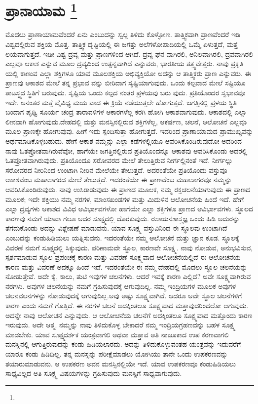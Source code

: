 
\chapter[ಪ್ರಾನಾಯಾಮ ]{ಪ್ರಾನಾಯಾಮ \protect\footnote{}}

ಮೊದಲು ಪ್ರಾಣಾಯಾಮವೆಂದರೆ ಏನು ಎಂಬುದನ್ನು ಸ್ವಲ್ಪ ತಿಳಿದು ಕೊಳ್ಳೋಣ. ತಾತ್ತ್ವಿಕವಾಗಿ ಪ್ರಾಣವೆಂದರೆ ಇಡಿ ವಿಶ್ವದಲ್ಲಿರುವ ಶಕ್ತಿಯ ಮೊತ್ತ. ತಾತ್ತ್ವಿಕ ದೃಷ್ಟಿಯಲ್ಲಿ ಈ ಜಗತ್ತು ಅಲೆಗಳೋಪಾದಿಯಲ್ಲಿ ಒಮ್ಮೆ ಏಳುತ್ತದೆ, ಮತ್ತೆ ಲಯವಾಗುತ್ತದೆ. ಇಡೀ ವಿಶ್ವ ದ್ರವ್ಯ ಮತ್ತು ಪ್ರಾಣಗಳಿಂದ ಆಗಿದೆ. ದ್ರವ್ಯ ಘನ ವಾಗಿರಲಿ, ಅನಿಲವಾಗಿರಲಿ, ದ್ರವವಾಗಿರಲಿ ಎಲ್ಲವೂ ಆಕಾಶ ಎನ್ನುವ ಮೂಲ ದ್ರವ್ಯದಿಂದ ಉತ್ಪನ್ನವಾಗಿದೆ ಎನ್ನುವರು, ಭಾರತೀಯ ತತ್ತ್ವವೇತ್ತರು. ನಾವು ಪ್ರಕೃತಿ ಯಲ್ಲಿ ಕಾಣುವ ಎಲ್ಲಾ ಶಕ್ತಿಗಳೂ ಯಾವ ಮೂಲಶಕ್ತಿಯ ಅಭಿವ್ಯಕ್ತಿಯೋ ಅದನ್ನು ಆ ತಾತ್ತ್ವಿಕರು ಪ್ರಾಣ ಎನ್ನುವರು. ಈ ಪ್ರಾಣವು ಆಕಾಶದ ಮೇಲೆ ತನ್ನ ಪ್ರಭಾವ ವನ್ನು ಬೀರಿದಾಗ ಸೃಷ್ಟಿಯಾಗುವುದು. ಒಂದು ಕಲ್ಪವಾದ ಮೇಲೆ ಸಷ್ಟಿಯೂ ತಾಟಸ್ಥ್ಯದ ಸ್ಥಿತಿಗೆ ಬರುವುದು. ಸೃಷ್ಟಿಯ ಒಂದು ಕಲ್ಪದ ನಂತರ ಪ್ರಳಯವು ಬರು ವುದು. ಪ್ರತಿಯೊಂದರ ಸ್ವಭಾವವೂ ಇದೇ. ಅನಂತರ ಮತ್ತೆ ವೈವಿಧ್ಯ ಮಯ ವಾದ ಈ ಕ್ರಿಯೆ ನಡೆಯುತ್ತಲೇ ಹೋಗುತ್ತದೆ. ಜಗತ್ತಿನಲ್ಲಿ ಪ್ರಳಯ ಸ್ಥಿತಿ ಬಂದಾಗ ಪೃಥ್ವಿ ಸೂರ್ಯ ಚಂದ್ರ ತಾರಾವಳಿಗಳ ಆಕಾರಗಳೆಲ್ಲ ಕರಗಿ ಹೋಗಿ ಆಕಾಶವಾಗುವುದು. ಆಕಾಶದಲ್ಲಿ ಎಲ್ಲಾ ಲೀನವಾಗಿ ಹೋಗುವುದು.ದೇಹದಲ್ಲಿ ಮತ್ತು ಮನಸ್ಸಿನಲ್ಲಿರುವ ಶಕ್ತಿಗಳೆಲ್ಲ, ಆಕರ್ಷಣ, ಚಲನೆ, ಆಲೋಚನೆ ಎಲ್ಲವೂ ಮೂಲ ಪ್ರಾಣಕ್ಕೇ ಹೋಗುವುವು. ಹೀಗೆ ಇದು ಸ್ಪಂದಿಸುತ್ತಾ ಹೋಗುತ್ತದೆ. ಇದರಿಂದ ಪ್ರಾಣಾಯಾಮದ ಪ್ರಾಮುಖ್ಯವನ್ನು ಅರ್ಥಮಾಡಿಕೊಳ್ಳಬಹುದು. ಹೇಗೆ ಆಕಾಶ ನಮ್ಮನ್ನು ಎಲ್ಲಾ ಕಡೆಗಳಲ್ಲಿಯೂ ಆವರಿಸಿಕೊಂಡಿರುವುದೋ ಅದರಿಂದ ನಾವು ಓತಪ್ರೋತವಾಗಿರುವೆವೋ, ಹಾಗೆಯೇ ಜಗತ್ತಿನಲ್ಲಿರುವ ಪ್ರತಿಯೊಂದನ್ನೂ ಆಕಾಶವು ಆವರಿಸಿಕೊಂಡು ಅದರಲ್ಲಿ ಓತಪ್ರೋತವಾಗಿರುವುದು. ಪ್ರತಿಯೊಂದೂ ಸರೋವರದ ಮೇಲೆ ತೇಲುತ್ತಿರುವ ನೀರ್ಗಲ್ಲಿನಂತೆ ಇದೆ. ನೀರ್ಗಲ್ಲು ಸರೋವರದ ನೀರಿನಿಂದ ಉಂಟಾಗಿ ನೀರಿನ ಮೇಲೆಯೇ ತೇಲುತ್ತದೆ. ಅದರಂತೆಯೇ ಪ್ರತಿಯೊಂದು ವಸ್ತುವೂ ಆಕಾಶವೆಂಬ ಮಹಾಸಾಗರದ ಮೇಲೆ ತೇಲುತ್ತದೆ. ಇದರಂತೆಯೇ ಈ ಪ್ರಾಣವೆಂಬ ಮಹಾಸಾಗರವೂ ನಮ್ಮನ್ನು ಆವರಿಸಿಕೊಂಡಿರುವುದು. ನಾವು ಉಸಿರಾಡುವುದು ಈ ಪ್ರಾಣದ ಮೂಲಕ, ನಮ್ಮ ರಕ್ತಚಲನೆಯಾಗುವುದು ಈ ಪ್ರಾಣದ ಮೂಲಕ; ಇದೇ ಶಕ್ತಿಯು ನಮ್ಮ ನರಗಳ, ಮಾಂಸಖಂಡಗಳ ಮತ್ತು ಮಿದುಳಿನ ಆಲೋಚನೆಯ ಹಿಂದೆ ಇದೆ. ಹೇಗೆ ಎಲ್ಲಾ ದ್ರವ್ಯಗಳು ಆಕಾಶದ ವಿವಿಧ ಆವಿರ್ಭಾವಗಳೋ ಹಾಗೆಯೇ ಎಲ್ಲಾ ಶಕ್ತಿಗಳೂ ಪ್ರಾಣದ ಆವಿರ್ಭಾವಗಳು. ಸ್ಥೂಲದ ಕಾರಣವು ನಮಗೆ ಯಾವಾ ಗಲೂ ಅದರ ಸೂಕ್ಷ್ಮದಲ್ಲಿ ದೊರಕುವುದು. ರಸಾಯನಶಾಸ್ತ್ರಜ್ಞ ಒಂದು ಹಿಡಿ ಅದುರನ್ನು ತೆಗೆದುಕೊಂಡು ಅದನ್ನು ವಿಶ್ಲೇಷಣೆ ಮಾಡುವನು. ಯಾವ ಸೂಕ್ಷ್ಮ ವಸ್ತುವಿನಿಂದ ಈ ಸ್ಥೂಲವು ಉಂಟಾಗಿದೆ ಎಂಬುದನ್ನು ಕಂಡುಹಿಡಿಯಲು ಯತ್ನಿಸುವನು. ಇದರಂತೆಯೇ ನಮ್ಮ ಆಲೋಚನೆ ಮತ್ತು ಜ್ಞಾನ ಕೂಡ. ಸ್ಥೂಲಕ್ಕೆ ವಿವರಣೆ ನಮಗೆ ಸೂಕ್ಷ್ಮದಲ್ಲಿ ಸಿಕ್ಕುವುದು. ಪರಿಣಾಮವೇ ಸ್ಥೂಲ, ಕಾರಣವೇ ಸೂಕ್ಷ್ಮ. ನಾವು ನೋಡುವ, ಅನುಭವಿಸುವ, ಸ್ಪರ್ಶಮಾಡುವ ಸ್ಥೂಲ ಪ್ರಪಂಚಕ್ಕೆ ಕಾರಣ ಮತ್ತು ವಿವರಣೆ ಸೂಕ್ಷ್ಮವಾದ ಆಲೋಚನೆಯಲ್ಲಿದೆ ಈ ಆಲೋಚನೆಯ ಕಾರಣ ಮತ್ತು ವಿವರಣೆ ಅದಕ್ಕೂ ಹಿಂದೆ ಇದೆ. ಇದರಂತೆಯೇ ಈ ನಮ್ಮ ದೇಹದಲ್ಲಿ ಮೊದಲು ಸ್ಥೂಲ ಚಲನೆಯನ್ನು ನೋಡುತ್ತೇವೆ. ಅದೇ ಕೈ, ಕಾಲು, ತುಟಿ ಇವುಗಳ ಚಲನೆಗಳು. ಆದರೆ ಇವಕ್ಕೆ ಕಾರಣ ಎಲ್ಲಿದೆ? ಅವೇ ಸೂಕ್ಷ್ಮವಾಗಿರುವ ನರಗಳು. ಅವುಗಳ ಚಲನೆಯನ್ನು ನಮಗೆ ಗ್ರಹಿಸುವುದಕ್ಕೆ ಆಗುವುದಿಲ್ಲ. ನಮ್ಮ ಇಂದ್ರಿಯಗಳ ಮೂಲಕ ಅವುಗಳ ಚಲನವಲನಗಳನ್ನು ನೋಡುವುದಕ್ಕೆ ಆಗುವುದಿಲ್ಲ.ಅವು ಅಷ್ಟು ಸೂಕ್ಷ್ಮವಾಗಿವೆ. ಆದರೂ ಅವೇ ಸ್ಥೂಲ ಚಲನೆಗಳಿಗೆ ಕಾರಣ ಎಂದು ನಮಗೆ ಗೊತ್ತಿದೆ. ಈ ನರಗಳ ಚಲನೆ ಅದಕ್ಕಿಂತಲೂ ಸೂಕ್ಷ್ಮವಾದ ಮತ್ತಾವುದರಿಂದಲೋ ಆಗುವುದು. ಅದನ್ನೇ ನಾವು ಆಲೋಚನೆ ಎನ್ನುವುದು. ಆ ಆಲೋಚನೆಯ ಚಲನೆಗೆ ಅದಕ್ಕಿಂತಲೂ ಸೂಕ್ಷ್ಮವಾದ ಮತ್ತೊಂದು ಕಾರಣ ಇರುವುದು. ಅದೇ ಆತ್ಮ. ನಮ್ಮನ್ನು ನಾವು ತಿಳಿದುಕೊಳ್ಳ ಬೇಕಾದರೆ ನಮ್ಮ ಇಂದ್ರಿಯಗ್ರಹಣವನ್ನು ಬಹಳ ಸೂಕ್ಷ್ಮ ಮಾಡಬೇಕು. ಯಾವ ಸೂಕ್ಷ್ಮದರ್ಶಕ ಯಂತ್ರವಾಗಲಿ ಅಥವಾ ಮತ್ತಾವ ಅತಿ ನಾಜೂಕಾದ ಉಪ ಕರಣವಾಗಲಿ ಮನಸ್ಸಿನಲ್ಲಿ ಆಗುತ್ತಿರುವುದನ್ನು ಕಂಡು ಹಿಡಿಯಲಾರದು. ಅದನ್ನು ತಿಳಿದುಕೊಳ್ಳುವಂತಹ ಯಂತ್ರವನ್ನು ಇದುವರೆಗೆ ಯಾರೂ ಕಂಡು ಹಿಡಿದಿಲ್ಲ. ತನ್ನ ಮನಸ್ಸನ್ನು ಪರೀಕ್ಷೆಮಾಡಲು ಯೋಗಿಯು ತಾನೇ ಒಂದು ಉಪಕರಣವನ್ನು ತಯಾರುಮಾಡುವನು. ಆ ಉಪಕರಣ ಅವನ ಮನಸ್ಸಿನಲ್ಲಿಯೇ ಇದೆ. ಯಾವ ಉಪಕರಣವೂ ಕಂಡುಹಿಡಿಯಲು ಸಾಧ್ಯವಿಲ್ಲದ ಅತಿ ಸೂಕ್ಷ್ಮ ವಿಷಯಗಳನ್ನು ಗ್ರಹಿಸುವುದು ಮನಸ್ಸಿಗೆ ಸಾಧ್ಯವಾಗುವುದು.

